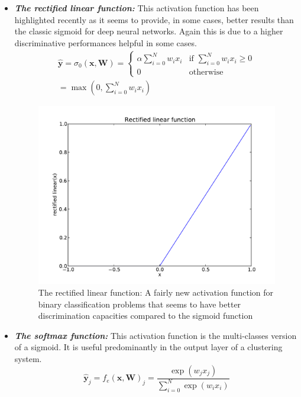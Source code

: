 \documentclass[a4paper,11pt]{report}
\newcommand{\Important}[1]{\textbf{{\em #1}}}
\begin{document}
\begin{itemize}
				\item \Important{The rectified linear function:} This activation function has been highlighted recently as it seems to provide, in some cases, better results than the classic sigmoid for deep neural networks. Again this is due to a higher discriminative performances helpful in some cases.\\
				\begin{equation}
					\begin{split}
						\mathbf{\hat{y}} = \sigma_{0}(\mathbf{x}, \mathbf{W}) =         
						\begin{cases}
							\alpha\sum_{i=0}^{N} w_{i} x_{i}  & \text{if } \sum_{i=0}^{N} w_{i} x_{i} \geq 0 \\
							0 & \text{otherwise}
						\end{cases} \\
						= \max(0, \sum_{i=0}^{N} w_{i} x_{i})
					\end{split}
				\end{equation}
				\begin{figure}[H]
					\begin{center}
						\includegraphics[width=3 in]{Images/NN/rl.pdf}
						\caption[Activation function: The rectified linear]{The rectified linear function: A fairly new activation function for binary classification problems that seems to have better discrimination capacities compared to the sigmoid function}
						\label{fig:The rectified linear function}
					\end{center}
				\end{figure}
       
				\item \Important{The softmax function:} This activation function is the multi-classes version of a sigmoid. It is useful predominantly in the output layer of a clustering system.
				\begin{equation}
					\mathbf{\hat{y}}_{j} = f_{e}(\mathbf{x}, \mathbf{W})_{j} = \frac{\exp(w_{j}x_{j})}{\sum_{i=0}^{N} \exp(w_{i} x_{i})}
				\end{equation}\\     
			\end{itemize}
 
\end{document}
